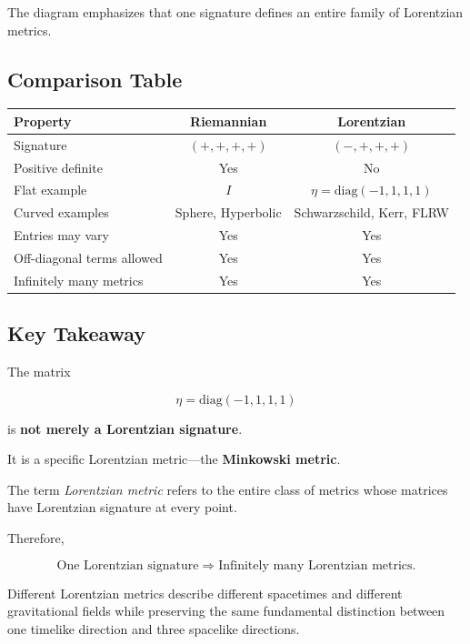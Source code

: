 \documentclass[12pt,a4paper]{article}
\theoremstyle{notespace}
\begin{document}
The diagram emphasizes that one signature defines an entire family of Lorentzian metrics.


\subsection{Comparison Table}

\begin{center}
	\renewcommand{\arraystretch}{1.4}
	\begin{tabular}{|p{4cm}|c|c|}
		\hline
		\rowcolor{blue!15}
		\textbf{Property} & \textbf{Riemannian} & \textbf{Lorentzian}\\
		\hline
		Signature &
		$(+,+,+,+)$ &
		$(-,+,+,+)$\\
		\hline
		Positive definite &
		Yes &
		No\\
		\hline
		Flat example &
		$I$ &
		$\eta=\mathrm{diag}(-1,1,1,1)$\\
		\hline
		Curved examples &
		Sphere, Hyperbolic &
		Schwarzschild, Kerr, FLRW\\
		\hline
		Entries may vary &
		Yes &
		Yes\\
		\hline
		Off-diagonal terms allowed &
		Yes &
		Yes\\
		\hline
		Infinitely many metrics &
		Yes &
		Yes\\
		\hline
	\end{tabular}
\end{center}


\subsection{Key Takeaway}

The matrix

\[
\eta=\mathrm{diag}(-1,1,1,1)
\]

is \textbf{not merely a Lorentzian signature}.

It is a specific Lorentzian metric—the \textbf{Minkowski metric}.

The term \emph{Lorentzian metric} refers to the entire class of metrics whose matrices have Lorentzian signature at every point.

Therefore,

\[
\boxed{
	\text{One Lorentzian signature}
	\;\Longrightarrow\;
	\text{Infinitely many Lorentzian metrics.}
}
\]

Different Lorentzian metrics describe different spacetimes and different gravitational fields while preserving the same fundamental distinction between one timelike direction and three spacelike directions.
\end{document}
